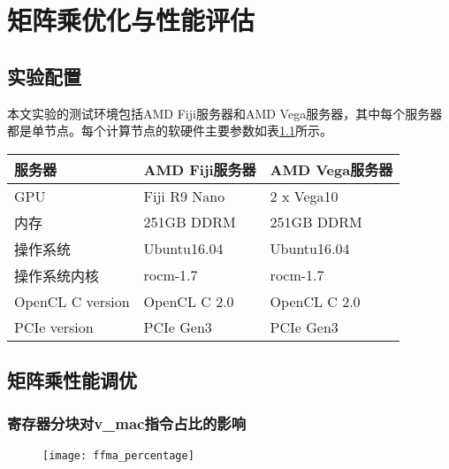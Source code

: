 \chapter{矩阵乘优化与性能评估}\label{chap:GEMMOpt}

\section{实验配置}

本文实验的测试环境包括AMD Fiji服务器和AMD Vega服务器，其中每个服务器都是单节点。每个计算节点的软硬件主要参数如表\ref{tab:hardwareplatform}所示。
\begin{table}[htbp]
	\label{tab:hardwareplatform}
	\begin{center}
		\begin{tabular}{ | l | p{6cm} | p{6cm} |}
			\hline
			服务器 & AMD Fiji服务器 & AMD Vega服务器 \\ \hline
			GPU & Fiji R9 Nano & 2 x Vega10 \\ \hline
			内存 & 251GB DDRM & 251GB DDRM \\ \hline
			操作系统 & Ubuntu16.04 & Ubuntu16.04 \\ \hline
			操作系统内核 & rocm-1.7 & rocm-1.7 \\ \hline
			OpenCL C version & OpenCL C 2.0 & OpenCL C 2.0 \\ \hline
			PCIe version & PCIe Gen3 & PCIe Gen3 \\
			\hline
		\end{tabular}
	\end{center}	
\end{table}


\section{矩阵乘性能调优}

\subsection{寄存器分块对v\_mac指令占比的影响}
\begin{figure}[htbp]
	\centering
	\texttt{[image: ffma\_percentage]}
	\label{fig:ffma_percentage}
\end{figure}

